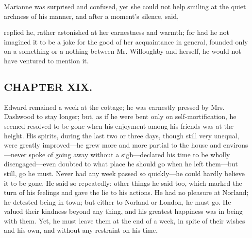 



Marianne was surprised and confused, yet she could not help smiling at the quiet archness of his manner, and after a moment's silence, said,


 replied he, rather astonished at her earnestness and warmth; for had he not imagined it to be a joke for the good of her acquaintance in general, founded only on a something or a nothing between Mr. Willoughby and herself, he would not have ventured to mention it.

\subsection[chapter-xix.]{\useURL[url19][][][]\from[url19]CHAPTER XIX.}

Edward remained a week at the cottage; he was earnestly pressed by Mrs. Dashwood to stay longer; but, as if he were bent only on self-mortification, he seemed resolved to be gone when his enjoyment among his friends was at the height. His spirits, during the last two or three days, though still very unequal, were greatly improved---he grew more and more partial to the house and environs---never spoke of going away without a sigh---declared his time to be wholly disengaged---even doubted to what place he should go when he left them---but still, go he must. Never had any week passed so quickly---he could hardly believe it to be gone. He said so repeatedly; other things he said too, which marked the turn of his feelings and gave the lie to his actions. He had no pleasure at Norland; he detested being in town; but either to Norland or London, he must go. He valued their kindness beyond any thing, and his greatest happiness was in being with them. Yet, he must leave them at the end of a week, in spite of their wishes and his own, and without any restraint on his time.

